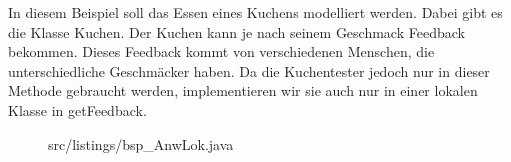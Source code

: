 In diesem Beispiel soll das Essen eines Kuchens modelliert werden.
 Dabei gibt es die Klasse Kuchen. Der Kuchen kann je nach seinem Geschmack Feedback bekommen.
Dieses Feedback kommt von verschiedenen Menschen, die unterschiedliche Geschmäcker haben.
Da die Kuchentester jedoch nur in dieser Methode gebraucht werden, implementieren wir sie auch nur in einer lokalen Klasse in getFeedback.
\\
\begin{figure}[H]
\lstset{language=Java}
 {src/listings/bsp_AnwLok.java}
\end{figure}
